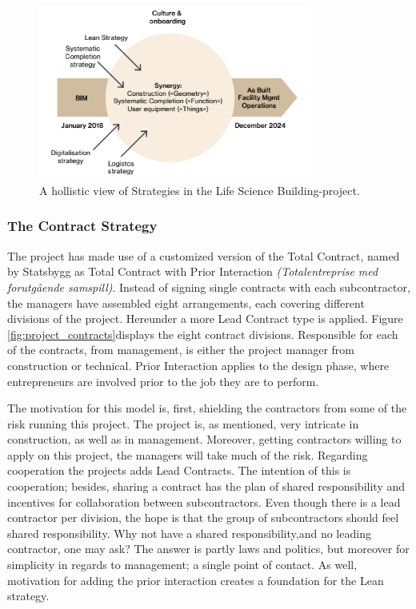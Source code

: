 \begin{figure}
    \centering
    \includegraphics[width=0.8\textwidth]{fig/LVB_strategy.png}
    \caption{A hollistic view of Strategies in the Life Science Building-project.}
    \label{fig:strategy}
\end{figure}

\subsubsection*{The Contract Strategy}
The project has made use of a customized version of the Total Contract, named by Statsbygg as Total Contract with Prior Interaction \textit{(Totalentreprise med forutgående samspill)}. Instead of signing single contracts with each subcontractor, the managers have assembled eight arrangements, each covering different divisions of the project. Hereunder a more Lead Contract type is applied. Figure \ref{fig:project_contracts}displays the eight contract divisions. Responsible for each of the contracts, from management, is either the project manager from construction or technical. Prior Interaction applies to the design phase, where entrepreneurs are involved prior to the job they are to perform. 

The motivation for this model is, first, shielding the contractors from some of the risk running this project. The project is, as mentioned, very intricate in construction, as well as in management. Moreover, getting contractors willing to apply on this project, the managers will take much of the risk. Regarding cooperation the projects adds Lead Contracts. The intention of this is cooperation; besides, sharing a contract has the plan of shared responsibility and incentives for collaboration between subcontractors. Even though there is a lead contractor per division, the hope is that the group of subcontractors should feel shared responsibility. Why not have a shared responsibility,and no leading contractor, one may ask? The answer is partly laws and politics, but moreover for simplicity in regards to management; a single point of contact. As well, motivation for adding the prior interaction creates a foundation for the Lean strategy.

